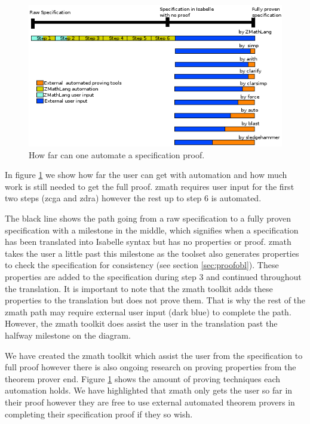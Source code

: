 \begin{figure}[H]
 \begin{center}
 \includegraphics [scale=0.75]{Figures/Design/timeline.png}
 \caption{How far can one automate a specification proof.}
 \label{fig:timeline}
\end{center}
\end{figure} 

In figure \ref{fig:timeline} we show how far the user can get with automation and how much work is still needed to get the full proof. \Gls{zmath} requires user input for the first two steps (\gls{zcga} and \gls{zdra}) however the rest up to step 6 is automated.

The black line shows the path going from a raw specification to a fully proven specification with a milestone in the middle, which signifies when a specification has been translated into Isabelle syntax but has no properties or proof. \Gls{zmath} takes the user a little past this milestone as the toolset also generates properties to check the specification for consistency (see section \ref{sec:proofobl}). These properties are added to the specification during step 3 and continued throughout the translation. It is important to note that the \gls{zmath} toolkit adds these properties to the translation but does not prove them. That is why the rest of the \gls{zmath} path may require external user input (dark blue) to complete the path. However, the \gls{zmath} toolkit does assist the user in the translation past the halfway milestone on the diagram.

We have created the \Gls{zmath} toolkit which assist the user from the specification to full proof however there is also ongoing research on proving properties from the theorem prover end. Figure \ref{fig:timeline} shows the amount of proving techniques each automation holds. We have highlighted that \gls{zmath} only gets the user so far in their proof however they are free to use external automated theorem provers in completing their specification proof if they so wish.

